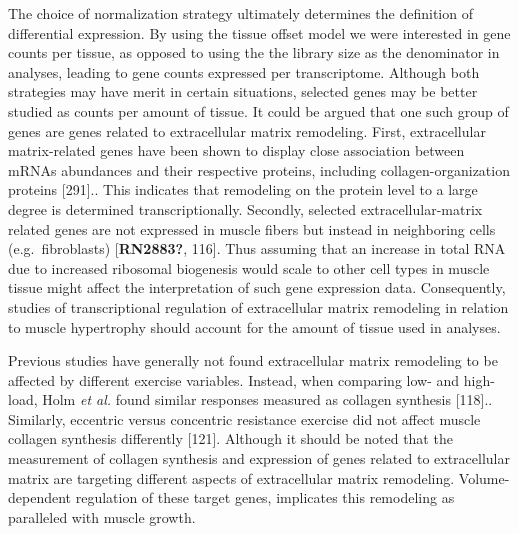 \documentclass[twoside,10pt]{gihclass} %
\begin{document}
The choice of normalization strategy ultimately determines the definition of differential expression. By using the tissue offset model we were interested in gene counts per tissue, as opposed to using the the library size as the denominator in analyses, leading to gene counts expressed per transcriptome. Although both strategies may have merit in certain situations, selected genes may be better studied as counts per amount of tissue. It could be argued that one such group of genes are genes related to extracellular matrix remodeling.
First, extracellular matrix-related genes have been shown to display close association between mRNAs abundances and their respective proteins, including collagen-organization proteins {[}291{]}..
This indicates that remodeling on the protein level to a large degree is determined transcriptionally.
Secondly, selected extracellular-matrix related genes are not expressed in muscle fibers but instead in neighboring cells (e.g.~fibroblasts)
{[}\textbf{RN2883?}, 116{]}.
Thus assuming that an increase in total RNA due to increased ribosomal biogenesis would scale to other cell types in muscle tissue might affect the interpretation of such gene expression data.
Consequently, studies of transcriptional regulation of extracellular matrix remodeling in relation to muscle hypertrophy should account for the amount of tissue used in analyses.

Previous studies have generally not found extracellular matrix remodeling to be affected by different exercise variables. Instead, when comparing low- and high-load, Holm \emph{et al.} found similar responses measured as collagen synthesis {[}118{]}..
Similarly, eccentric versus concentric resistance exercise did not affect muscle collagen synthesis differently
{[}121{]}.
Although it should be noted that the measurement of collagen synthesis and expression of genes related to extracellular matrix are targeting different aspects of extracellular matrix remodeling. Volume-dependent regulation of these target genes, implicates this remodeling as paralleled with muscle growth.
\end{document}
